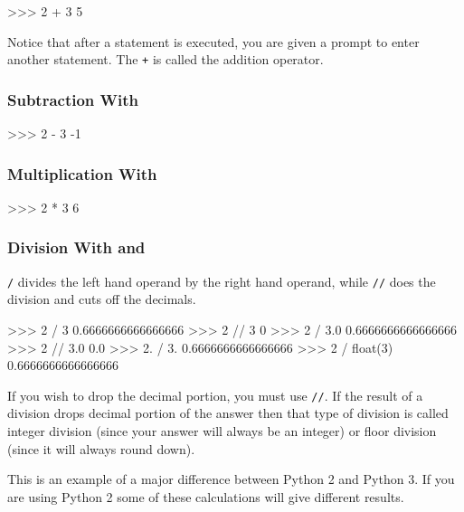 \documentclass[11pt]{cselabheader}
\begin{document}
\begin{pyconcode}
>>> 2 + 3
5

\end{pyconcode}

Notice that after a statement is executed, you are given a prompt to
enter another statement. The \texttt{+} is
called the addition operator.

\subsubsection{Subtraction With \pythoninline{-}}

\begin{pyconcode}
>>> 2 - 3
-1

\end{pyconcode}

\subsubsection{Multiplication With \pythoninline{*}}

\begin{pyconcode}
>>> 2 * 3
6

\end{pyconcode}

\subsubsection{Division With \pythoninline{/} and \pythoninline{//}}

\texttt{/} divides the left hand operand
by the right hand operand, while \texttt{//} does the division and cuts off the decimals.

\begin{pyconcode}
>>> 2 / 3
0.6666666666666666
>>> 2 // 3
0
>>> 2 / 3.0
0.6666666666666666
>>> 2 // 3.0
0.0
>>> 2. / 3.
0.6666666666666666
>>> 2 / float(3)
0.6666666666666666

\end{pyconcode}

If you wish to drop the decimal portion, you must use \texttt{//}. If
the result of a division drops decimal portion of the answer then that
type of division is called integer division (since your answer will
always be an integer) or floor division (since it will always round
down).

This is an example of a major difference between Python 2 and Python 3. If
you are using Python 2 some of these calculations will give different
results.
\end{document}
